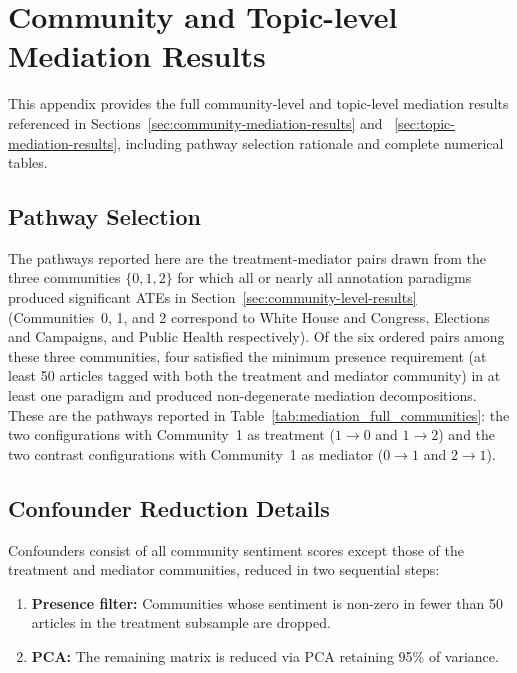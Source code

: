 \chapter{Community and Topic-level Mediation Results}
\label{sec:appendix-community-mediation}

This appendix provides the full community-level and topic-level mediation results referenced in Sections~\ref{sec:community-mediation-results} and ~\ref{sec:topic-mediation-results}, including pathway selection rationale and complete numerical tables.

\section{Pathway Selection}

The pathways reported here are the treatment-mediator pairs drawn from the three communities $\{0, 1, 2\}$ for which all or nearly all annotation paradigms produced significant ATEs in Section~\ref{sec:community-level-results} (Communities~0, 1, and 2 correspond to White House and Congress, Elections and Campaigns, and Public Health respectively). Of the six ordered pairs among these three communities, four satisfied the minimum presence requirement (at least 50 articles tagged with both the treatment and mediator community) in at least one paradigm and produced non-degenerate mediation decompositions. These are the pathways reported in Table~\ref{tab:mediation_full_communities}: the two configurations with Community~1 as treatment ($1 \to 0$ and $1 \to 2$) and the two contrast configurations with Community~1 as mediator ($0 \to 1$ and $2 \to 1$).

\section{Confounder Reduction Details}

Confounders consist of all community sentiment scores except those of the treatment and mediator communities, reduced in two sequential steps:

\begin{enumerate}
    \item \textbf{Presence filter:} Communities whose sentiment is non-zero in fewer than 50 articles in the treatment subsample are dropped.
    \item \textbf{PCA:} The remaining matrix is reduced via PCA retaining 95\% of variance.
\end{enumerate}

